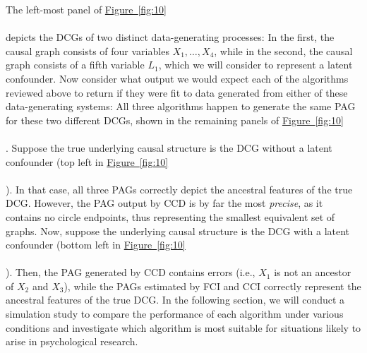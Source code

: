 \documentclass[twoside, 11pt]{article}
\newcommand*{\figref}[2][]{%
  \hyperref[{fig:#2}]{%
    Figure~\ref*{fig:#2}%
    \ifx\\#1\\%
    \else
      #1%
    \fi
  }%
}
\begin{document}
The left-most panel of \figref[]{10} depicts the DCGs of two distinct data-generating processes: In the first, the causal graph consists of four variables $X_1, \dots, X_4$, while in the second, the causal graph consists of a fifth variable $L_1$, which we will consider to represent a latent confounder. Now consider what output we would expect each of the algorithms reviewed above to return if they were fit to data generated from either of these data-generating systems: All three algorithms happen to generate the same PAG for these two different DCGs, shown in the remaining panels of \figref[]{10}. Suppose the true underlying causal structure is the DCG without a latent confounder (top left in \figref[]{10}). In that case, all three PAGs correctly depict the ancestral features of the true DCG. However, the PAG output by CCD is by far the most \textit{precise}, as it contains no circle endpoints, thus representing the smallest equivalent set of graphs. Now, suppose the underlying causal structure is the DCG with a latent confounder (bottom left in \figref[]{10}). Then, the PAG generated by CCD contains errors (i.e., $X_1$ is not an ancestor of $X_2$ and $X_3$), while the PAGs estimated by FCI and CCI correctly represent the ancestral features of the true DCG. In the following section, we will conduct a simulation study to compare the performance of each algorithm under various conditions and investigate which algorithm is most suitable for situations likely to arise in psychological research.



\end{document}
